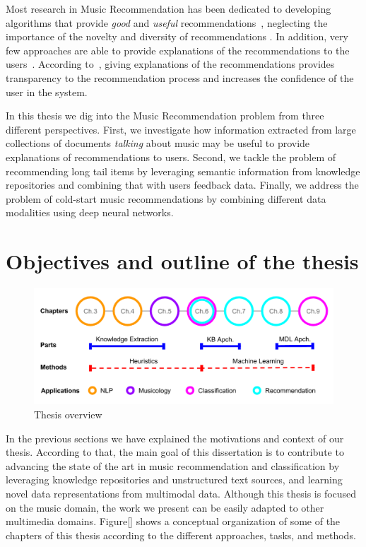 Most research in Music Recommendation has been dedicated to developing algorithms that provide \textit{good} and \textit{useful} recommendations~\citep{oscarBook}, neglecting the importance of the novelty and diversity of recommendations \citep{adomavicius2012improving,Bellogin2010}. In addition, very few approaches are able to provide explanations of the recommendations to the users~\citep{Passant2008, Passant2010}. According to~\cite{celma2008new}, giving explanations of the recommendations provides transparency to the recommendation process and increases the confidence of the user in the system.

In this thesis we dig into the Music Recommendation problem from three different perspectives. First, we investigate how information extracted from large collections of documents \textit{talking} about music may be useful to provide explanations of recommendations to users. Second, we tackle the problem of recommending long tail items by leveraging semantic information from knowledge repositories and combining that with users feedback data. Finally, we address the problem of cold-start music recommendations by combining different data modalities using deep neural networks.


\section{Objectives and outline of the thesis}
\label{sec:intro:objectives}

\begin{figure}
	\centering
	\includegraphics[width=\textwidth]{ch01_introduction_pics/Thesis_schema.png}
	\caption{Thesis overview \label{fig:intro:chapters}}
\end{figure}

In the previous sections we have explained the motivations and context of our thesis. According to that, the main goal of this dissertation is to contribute to advancing the state of the art in music recommendation and classification by leveraging knowledge repositories and unstructured text sources, and learning novel data representations from multimodal data. Although this thesis is focused on the music domain, the work we present can be easily adapted to other multimedia domains. Figure\ref{} shows a conceptual organization of some of the chapters of this thesis according to the different approaches, tasks, and methods.

